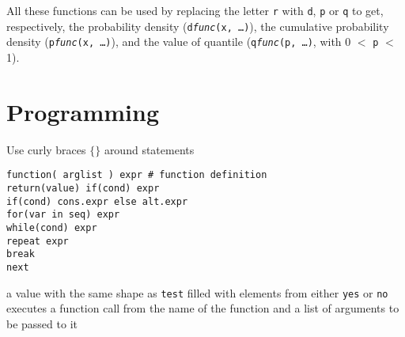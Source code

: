 {All these functions can be used by replacing the letter {\tt r} with
{\tt d}, {\tt p} or {\tt q} to get, respectively, the probability
density ({\tt d{\it func}(x, \ldots)}), the cumulative probability
density ({\tt p{\it func}(x, \ldots)}), and the value of quantile
({\tt q{\it func}(p, \ldots)}, with 0 $<$ {\tt p} $<$ 1).

\section{Programming}{ Use curly braces $\lbrace\rbrace$ around statements }

{\tt function( arglist ) expr \# function definition\\ return(value) if(cond)
    expr\\ if(cond) cons.expr else  alt.expr\\ for(var in seq) expr\\
    while(cond) expr\\ repeat expr\\ break\\ next\\ }


	{a value with the same shape as {\tt test} filled with elements from either {\tt yes} or {\tt no}}
	{executes a function call from the name of the function and a list of arguments to be passed to it}

}
